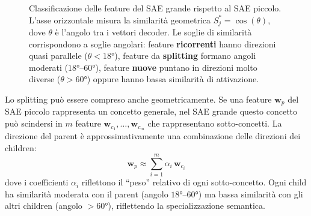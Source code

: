 \begin{figure}[htbp]
\begin{tikzpicture}[scale=1.0]
    \end{tikzpicture}
    \caption{Classificazione delle feature del SAE grande rispetto al SAE piccolo. L'asse orizzontale misura la similarità geometrica $S^*_j = \cos(\theta)$, dove $\theta$ è l'angolo tra i vettori decoder. Le soglie di similarità corrispondono a soglie angolari: feature \textbf{ricorrenti} hanno direzioni quasi parallele ($\theta < 18°$), feature da \textbf{splitting} formano angoli moderati ($18°$--$60°$), feature \textbf{nuove} puntano in direzioni molto diverse ($\theta > 60°$) oppure hanno bassa similarità di attivazione.}
    \label{fig:feature_classification}
\end{figure}

Lo splitting può essere compreso anche geometricamente. Se una feature $\mathbf{w}_p$ del SAE piccolo rappresenta un concetto generale, nel SAE grande questo concetto può scindersi in $m$ feature $\mathbf{w}_{c_1}, \dots, \mathbf{w}_{c_m}$ che rappresentano sotto-concetti. La direzione del parent è approssimativamente una combinazione delle direzioni dei children:
\begin{equation}
    \mathbf{w}_p \approx \sum_{i=1}^{m} \alpha_i \, \mathbf{w}_{c_i}
    \label{eq:splitting_geometry}
\end{equation}
dove i coefficienti $\alpha_i$ riflettono il ``peso'' relativo di ogni sotto-concetto. Ogni child ha similarità moderata con il parent (angolo $18°$--$60°$) ma bassa similarità con gli altri children (angolo $> 60°$), riflettendo la specializzazione semantica.

